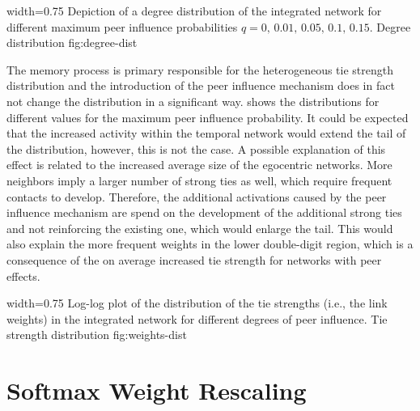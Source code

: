       {width=0.75\textwidth}
      {Depiction of a degree distribution of the integrated network for different maximum peer influence probabilities \( q = 0, \, 0.01, \, 0.05, \, 0.1, \, 0.15\).}
      {Degree distribution}
      {fig:degree-dist}


The memory process is primary responsible for the heterogeneous tie strength distribution and the introduction of the peer influence mechanism does in fact not change the distribution in a significant way.
 shows the distributions for different values for the maximum peer influence probability.
It could be expected that the increased activity within the temporal network would extend the tail of the distribution, however, this is not the case.
A possible explanation of this effect is related to the increased average size of the egocentric networks.
More neighbors imply a larger number of strong ties as well, which require frequent contacts to develop.
Therefore, the additional activations caused by the peer influence mechanism are spend on the development of the additional strong ties and not reinforcing the existing one, which would enlarge the tail.
This would also explain the more frequent weights in the lower double-digit region, which is a consequence of the on average increased tie strength for networks with peer effects.


      {width=0.75\textwidth}
      {Log-log plot of the distribution of the tie strengths (i.e., the link weights) in the integrated network for different degrees of peer influence.}
      {Tie strength distribution}
      {fig:weights-dist}




\section{Softmax Weight Rescaling}
\label{sec:softmax-rescaling}
